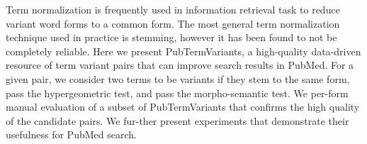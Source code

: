 Term normalization is frequently used in information retrieval task to reduce variant word forms to a common form. The most general term normalization technique used in practice is stemming, however it has been found to not be completely reliable.  Here we present PubTermVariants, a high-quality data-driven resource of term variant pairs that can improve search results in PubMed. For a given pair, we consider two terms to be variants if they stem to the same form, pass the hypergeometric test, and pass the morpho-semantic test. We per-form manual evaluation of a subset of PubTermVariants that confirms the high quality of the candidate pairs. We fur-ther present experiments that demonstrate their usefulness for PubMed search.
